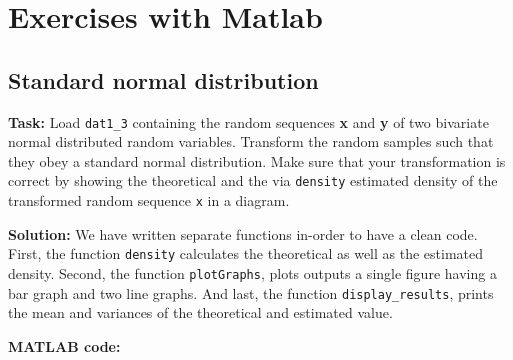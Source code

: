 
\chapter{Exercises with Matlab}


\section{ Standard normal distribution } \label{ Standard normal distribution } 
\noindent \textbf{Task:} Load \texttt{dat1\_3}  containing the random sequences \textbf{x} and \textbf{y} of two bivariate normal distributed random variables. Transform the random samples such that they obey a standard normal distribution. Make sure that your transformation is correct by showing the theoretical and the via \texttt{density} estimated density of the transformed random sequence \texttt{x} in a diagram. 

\noindent \textbf{Solution:}
\noindent We have written separate functions in-order to have a clean code. First, the function \texttt{density} calculates the theoretical as well as the estimated density. Second, the function \texttt{plotGraphs}, plots outputs a single figure having a bar graph and two line graphs. And last, the function \texttt{display\_results}, prints the mean and variances of the theoretical and estimated value. 

\noindent \textbf{MATLAB code:}


